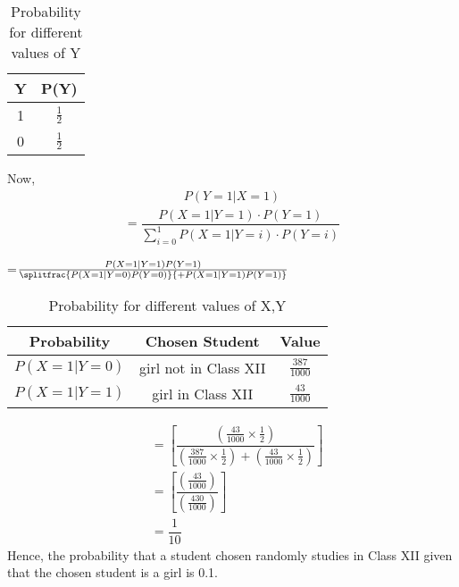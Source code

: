 \documentclass[journal,12pt,two column]{IEEEtran}
\begin{document}
\begin{table}[ht]
\caption{Probability for different values of Y}
\begin{center}
    \begin{tabular}{|c|c|}
    \hline
    Y & P(Y)\\
    \hline
    1 & $\frac{1}{2}$ \\
    \hline
    0 & $\frac{1}{2}$\\
    \hline
    \end{tabular}
\end{center} \label{table:caption}   
\end{table}
Now,
\begin{align}
P(Y=1 \vert X=1)   
\end{align}
\begin{align}
=\dfrac{P(X=1\vert Y=1)\cdot P(Y=1)}{\sum_{i=0}^{1} P(X=1\vert Y=i)\cdot P(Y=i)}
\end{align}
\begin{center} 
=$\frac{P(X=1 \vert Y=1)P(Y=1)}{\splitfrac{P(X=1\vert Y=0)P(Y=0)}{+P(X=1\vert Y=1)P(Y=1)}}$
\end{center}
\begin{table}[ht]
\caption{Probability for different values of X,Y}
\begin{center}
    \begin{tabular}{|c|c|c|}
    \hline
    Probability & Chosen Student & Value\\
    \hline
    $P(X=1\vert Y=0)$ & girl not in Class XII & $\frac{387}{1000}$\\
    \hline
    $ P(X=1\vert Y=1)$ & girl in Class XII & $\frac{43}{1000}$ \\
    \hline
    \end{tabular}
\end{center} \label{table:caption}   
\end{table} 
\begin{align}
&=\left[ \dfrac{\left( \frac{43}{1000}\times \frac{1}{2}\right)}{\left( \frac{387}{1000}\times \frac{1}{2} \right) + \left( \frac{43}{1000}\times \frac{1}{2} \right)}\right]\\
&=\left[ \dfrac{\left( \frac{43}{1000} \right)}{\left( \frac{430}{1000} \right)}\right]\\ 
&=\dfrac{1}{10} 
\end{align}
Hence, the probability that a student chosen randomly studies in Class XII given that the chosen student is a girl is 0.1.
\end{document}
